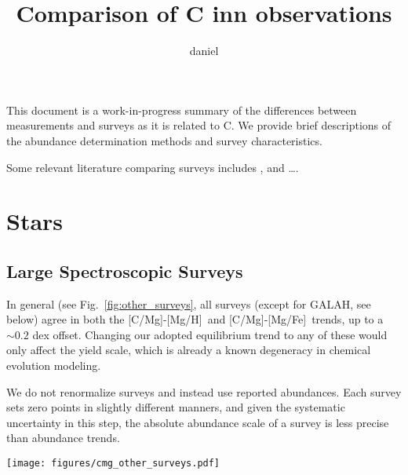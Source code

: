 \documentclass[11pt]{article}
\title{Comparison of C inn observations}
\author{daniel}
\newcommand{\caah}{[C/Mg]-[Mg/H]}
\newcommand{\caafe}{[C/Mg]-[Mg/Fe]}
\newcommand{\about}[1]{${\sim} #1$}
\begin{document}
\maketitle



This document is a work-in-progress summary of the differences between measurements and surveys as it is related to C. We provide brief descriptions of the abundance determination methods and survey characteristics.

Some relevant literature comparing surveys includes \citet{hegedhus+2023}, and \dots.

\section{Stars}

\subsection{Large Spectroscopic Surveys}
In general (see Fig.~\ref{fig:other_surveys}, all surveys (except for GALAH, see below) agree in both the \caah\ and \caafe\ trends, up to a \about{0.2} dex offset. Changing our adopted equilibrium trend to any of these would only affect the yield scale, which is already a known degeneracy in chemical evolution modeling. 


We do not renormalize surveys and instead use reported abundances. Each survey sets zero points in slightly different manners, and given the systematic uncertainty in this step, the absolute abundance scale of a survey is less precise than abundance trends.




\begin{figure*}
    \centering
    \texttt{[image: figures/cmg\_other\_surveys.pdf]}
    \caption{Binned median trends for several surveys.
    All samples agree up to a normalization for \caah\, and, even more encouragingly, samples approximately trace out the same trend in \caafe.}
    \label{fig:other_surveys}
\end{figure*}
\end{document}
